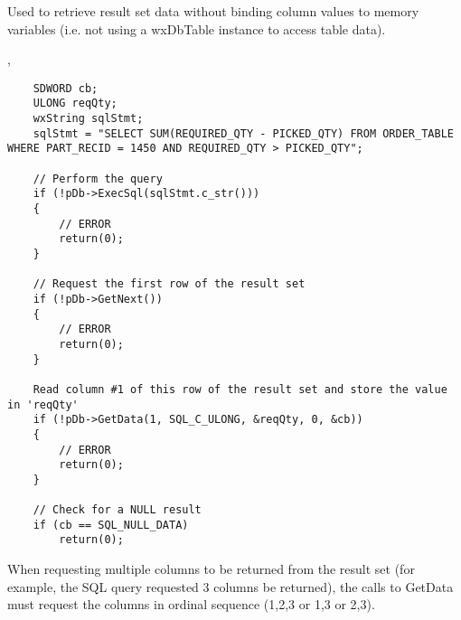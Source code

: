 \label{wxdbgetdata}


Used to retrieve result set data without binding column values to memory variables (i.e. not using a wxDbTable instance to access table data).




, 

\begin{verbatim}
	SDWORD cb;
	ULONG reqQty;
	wxString sqlStmt;
	sqlStmt = "SELECT SUM(REQUIRED_QTY - PICKED_QTY) FROM ORDER_TABLE WHERE PART_RECID = 1450 AND REQUIRED_QTY > PICKED_QTY";

	// Perform the query
	if (!pDb->ExecSql(sqlStmt.c_str()))
	{
		// ERROR
		return(0);
	}

	// Request the first row of the result set
	if (!pDb->GetNext())
	{
		// ERROR
		return(0);
	}

	Read column #1 of this row of the result set and store the value in 'reqQty'
	if (!pDb->GetData(1, SQL_C_ULONG, &reqQty, 0, &cb))
	{
		// ERROR
		return(0);
	}

	// Check for a NULL result
	if (cb == SQL_NULL_DATA)
		return(0);
\end{verbatim}


When requesting multiple columns to be returned from the result set (for example, the SQL query
requested 3 columns be returned), the calls to GetData must request the columns in ordinal
sequence (1,2,3 or 1,3 or 2,3).  


\label{wxdbgetdatabasename}


